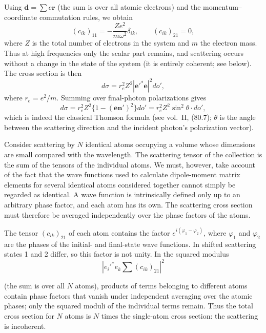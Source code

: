 Using $\mathbf d=\sum e\mathbf r$ (the sum is over all atomic electrons) and the momentum--coordinate commutation rules, we obtain
\begin{equation}
(c_{ik})_{11}=-\frac{Ze^2}{m\omega^2}\delta_{ik},\qquad (c_{ik})_{21}=0,
\tag{59.14}
\end{equation}
where $Z$ is the total number of electrons in the system and $m$ the electron mass. Thus at high frequencies only the scalar part remains, and scattering occurs without a change in the state of the system (it is entirely coherent; see below). The cross section is then
\begin{equation}
d\sigma=r_e^2Z^2|\mathbf e'^*\mathbf e|^2do',
\tag{59.15}
\end{equation}
where $r_e=e^2/m$. Summing over final-photon polarizations gives
\begin{equation}
d\sigma=r_e^2Z^2\{1-(\mathbf e\mathbf n')^2\}do'=r_e^2Z^2\sin^2\theta\cdot do',
\tag{59.16}
\end{equation}
which is indeed the classical Thomson formula (see vol.~II, (80.7); $\theta$ is the angle between the scattering direction and the incident photon's polarization vector).

Consider scattering by $N$ identical atoms occupying a volume whose dimensions are small compared with the wavelength. The scattering tensor of the collection is the sum of the tensors of the individual atoms. We must, however, take account of the fact that the wave functions used to calculate dipole-moment matrix elements for several identical atoms considered together cannot simply be regarded as identical. A wave function is intrinsically defined only up to an arbitrary phase factor, and each atom has its own. The scattering cross section must therefore be averaged independently over the phase factors of the atoms.

The tensor $(c_{ik})_{21}$ of each atom contains the factor $e^{i(\varphi_1-\varphi_2)}$, where $\varphi_1$ and $\varphi_2$ are the phases of the initial- and final-state wave functions. In shifted scattering states 1 and 2 differ, so this factor is not unity. In the squared modulus
\[
\left|e_i'^*e_k\sum(c_{ik})_{21}\right|^2
\]

(the sum is over all $N$ atoms), products of terms belonging to different atoms contain phase factors that vanish under independent averaging over the atomic phases; only the squared moduli of the individual terms remain. Thus the total cross section for $N$ atoms is $N$ times the single-atom cross section: the scattering is incoherent.

